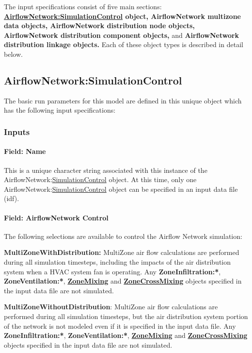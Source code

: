 The input specifications consist of five main sections: \textbf{\hyperref[airflownetworksimulationcontrol]{AirflowNetwork:\hyperref[simulationcontrol]{SimulationControl}} object, AirflowNetwork multizone data objects, AirflowNetwork distribution node objects, AirflowNetwork distribution component objects,} and \textbf{AirflowNetwork distribution linkage objects.} Each of these object types is described in detail below.

\subsection{AirflowNetwork:SimulationControl}\label{airflownetworksimulationcontrol}

The basic run parameters for this model are defined in this unique object which has the following input specifications:

\subsubsection{Inputs}\label{inputs-004}

\paragraph{Field: Name}\label{field-name-004}

This is a unique character string associated with this instance of the AirflowNetwork:\hyperref[simulationcontrol]{SimulationControl} object. At this time, only one AirflowNetwork:\hyperref[simulationcontrol]{SimulationControl} object can be specified in an input data file (idf).

\paragraph{Field: AirflowNetwork Control}\label{field-airflownetwork-control}

The following selections are available to control the Airflow Network simulation:

\textbf{MultiZoneWithDistribution:} MultiZone air flow calculations are performed during all simulation timesteps, including the impacts of the air distribution system when a HVAC system fan is operating. Any \textbf{ZoneInfiltration:*}, \textbf{ZoneVentilation:*}, \textbf{\hyperref[zonemixing]{ZoneMixing}} and \textbf{\hyperref[zonecrossmixing]{ZoneCrossMixing}} objects specified in the input data file are not simulated.

\textbf{MultiZoneWithoutDistribution}: MultiZone air flow calculations are performed during all simulation timesteps, but the air distribution system portion of the network is not modeled even if it is specified in the input data file. Any \textbf{ZoneInfiltration:*}, \textbf{ZoneVentilation:*}, \textbf{\hyperref[zonemixing]{ZoneMixing}} and \textbf{\hyperref[zonecrossmixing]{ZoneCrossMixing}} objects specified in the input data file are not simulated.

